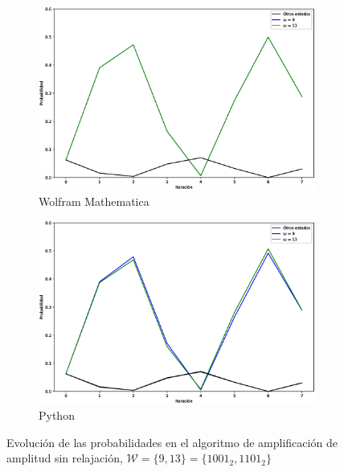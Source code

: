 \begin{figure}[H]
    \centering
    \begin{subfigure}[m]{0.49\textwidth}
        \centering
        \includegraphics[width=0.9\linewidth]{img/grover2M.eps}
        \caption{Wolfram Mathematica}
    \end{subfigure}
    \begin{subfigure}[m]{0.49\textwidth}
        \centering
        \includegraphics[width=0.9\linewidth]{img/grover2lossless.eps}
        \caption{Python}
    \end{subfigure}
    \caption[Evolución de las probabilidades en el algoritmo de amplificación de amplitud sin relajación, $\mathcal{W} = \{9, 13\}$]{Evolución de las probabilidades en el algoritmo de amplificación de amplitud sin relajación, $\mathcal{W} = \{9, 13\} = \{1001_2, 1101_2\}$}
    \label{fig:groverlosslesscomp2}
\end{figure}

